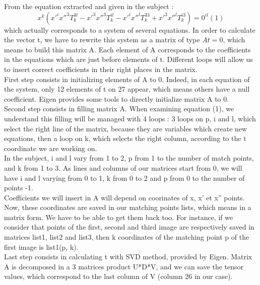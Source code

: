 \documentclass[a4paper,10pt]{report}
\begin{document}
From the equation extracted and given in the subject :
\[x^{k}(x'^{i}x''^{3}T^{3l}_{k} - x'^{3}x''^{3}T^{il}_{k} - x'^{i}x''^{l}T^{33}_{k} + x'^{3}x''^{l}T^{i3}_{k}) = 0^{il}  (1)\]
which actually corresponds to a system of several equations. In order to calculate the vector t, we have to rewrite this system as 
a matrix of type \begin{math}At = 0\end{math}, which means to build this matrix A. Each element of A corresponds to the coefficients in the equations 
which are just before elements of t. Different loops will allow us to insert correct coefficients in their right places in the matrix.
\\

First step consists in initializing elements of A to 0. Indeed, in each equation of the system, only 12 elements of t on 27 appear, which 
means others have a null coefficient. Eigen provides some tools to directly initialize matrix A to 0.
\\

Second step consists in filling matrix A. When examining equation (1), we understand this filling will be managed with 4 loops : 3 loops 
on p, i and l, which select the right line of the matrix, because they are variables which create new equations, then a loop on k, which
 selects the right column, according to the t coordinate we are working on.
\\

In the subject, i and l vary from 1 to 2, p from 1 to the number of match points, and k from 1 to 3. As lines and columns of our 
matrices start from 0, we will have i and l varying from 0 to 1, k from 0 to 2 and p from 0 to the number of points -1.
\\

Coefficients we will insert in A will depend on coorinates of x, x’ et x” points. Now, these coordinates are saved in our matching points
 lists, which means in a matrix form. We have to be able to get them back too. For instance, if we consider that points of the first, 
second and third image are respectively saved in matrices list1, list2 and list3, then k coordinates of the matching point p of the 
first image is list1(p, k).
\\

Last step consists in calculating t with SVD method, provided by Eigen. Matrix A is decomposed in a 3 matrices product U*D*V, and we can save the tensor values, which correspond to the last column of V (column 26 in our case).
\\
\end{document}
